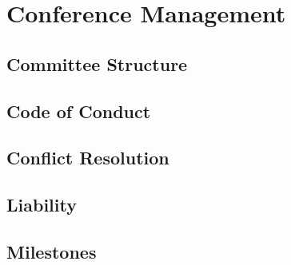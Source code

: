 \section{Conference Management}

\subsection{Committee Structure}

\subsection{Code of Conduct}

\subsection{Conflict Resolution}

\subsection{Liability}

\subsection{Milestones}
